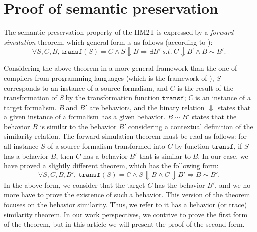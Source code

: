 \section{Proof of semantic preservation}
\label{sec:proof}

The semantic preservation property of the HM2T is expressed by a
\textit{forward simulation} theorem, which general form is as follows
(according to \cite{Leroy2009}):
\begin{equation*}
  \forall{}S,C,B,\mathtt{transf}(S)=C\land{}S\Downarrow{}B\Rightarrow{}\exists{}B'~s.t.~C\Downarrow{}B'\land{}B\sim{}B'.
\end{equation*}

Considering the above theorem in a more general framework than the one
of compilers from programming languages (which is the framework of
\cite{Leroy2009}), $S$ corresponds to an instance of a source
formalism, and $C$ is the result of the transformation of $S$ by the
transformation function $\mathtt{transf}$; $C$ is an instance of a
target formalism. $B$ and $B'$ are behaviors, and the binary relation
$\Downarrow$ states that a given instance of a formalism has a given
behavior. $B\sim{}B'$ states that the behavior $B$ is similar to the
behavior $B'$ considering a contextual definition of the similarity
relation. The forward simulation theorem must be read as follows: for
all instance $S$ of a source formalism transformed into $C$ by
function $\mathtt{transf}$, if $S$ has a behavior $B$, then $C$ has a
behavior $B'$ that is similar to $B$. In our case, we have proved a
slightly different theorem, which has the following form:
\begin{equation*}
  \forall{}S,C,B,B',~\mathtt{transf}(S)=C\land{}S\Downarrow{}B\land{}C\Downarrow{}B'\Rightarrow{}B\sim{}B'.
\end{equation*}
In the above form, we consider that the target $C$ has the behavior
$B'$, and we no more have to prove the existence of such a behavior.
This version of the theorem focuses on the behavior similarity. Thus,
we refer to it has a behavior (or trace) similarity theorem. In our
work perspectives, we contrive to prove the first form of the theorem,
but in this article we will present the proof of the second form.

